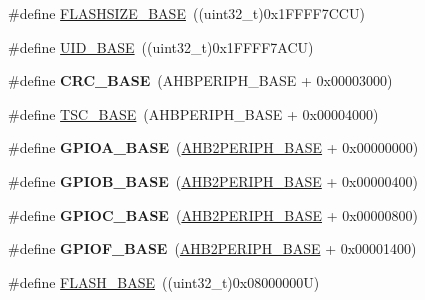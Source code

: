 \begin{DoxyCompactItemize}
\item 
\#define \hyperlink{group___peripheral__memory__map_ga776d985f2d4d40b588ef6ca9d573af78}{F\+L\+A\+S\+H\+S\+I\+Z\+E\+\_\+\+B\+A\+SE}~((uint32\+\_\+t)0x1\+F\+F\+F\+F7\+C\+C\+U)
\item 
\#define \hyperlink{group___peripheral__memory__map_ga664eda42b83c919b153b07b23348be67}{U\+I\+D\+\_\+\+B\+A\+SE}~((uint32\+\_\+t)0x1\+F\+F\+F\+F7\+A\+C\+U)
\item 
\mbox{\label{group___peripheral__memory__map_ga656a447589e785594cbf2f45c835ad7e}} 
\#define {\bfseries C\+R\+C\+\_\+\+B\+A\+SE}~(A\+H\+B\+P\+E\+R\+I\+P\+H\+\_\+\+B\+A\+SE + 0x00003000)
\item 
\#define \hyperlink{group___peripheral__memory__map_ga2bba7a31caeacaacd433abb71781e0af}{T\+S\+C\+\_\+\+B\+A\+SE}~(A\+H\+B\+P\+E\+R\+I\+P\+H\+\_\+\+B\+A\+SE + 0x00004000)
\item 
\mbox{\label{group___peripheral__memory__map_gad7723846cc5db8e43a44d78cf21f6efa}} 
\#define {\bfseries G\+P\+I\+O\+A\+\_\+\+B\+A\+SE}~(\hyperlink{group___peripheral__memory__map_gaeedaa71d22a1948492365e2cd26cfd46}{A\+H\+B2\+P\+E\+R\+I\+P\+H\+\_\+\+B\+A\+SE} + 0x00000000)
\item 
\mbox{\label{group___peripheral__memory__map_gac944a89eb789000ece920c0f89cb6a68}} 
\#define {\bfseries G\+P\+I\+O\+B\+\_\+\+B\+A\+SE}~(\hyperlink{group___peripheral__memory__map_gaeedaa71d22a1948492365e2cd26cfd46}{A\+H\+B2\+P\+E\+R\+I\+P\+H\+\_\+\+B\+A\+SE} + 0x00000400)
\item 
\mbox{\label{group___peripheral__memory__map_ga26f267dc35338eef219544c51f1e6b3f}} 
\#define {\bfseries G\+P\+I\+O\+C\+\_\+\+B\+A\+SE}~(\hyperlink{group___peripheral__memory__map_gaeedaa71d22a1948492365e2cd26cfd46}{A\+H\+B2\+P\+E\+R\+I\+P\+H\+\_\+\+B\+A\+SE} + 0x00000800)
\item 
\mbox{\label{group___peripheral__memory__map_ga7f9a3f4223a1a784af464a114978d26e}} 
\#define {\bfseries G\+P\+I\+O\+F\+\_\+\+B\+A\+SE}~(\hyperlink{group___peripheral__memory__map_gaeedaa71d22a1948492365e2cd26cfd46}{A\+H\+B2\+P\+E\+R\+I\+P\+H\+\_\+\+B\+A\+SE} + 0x00001400)
\item 
\#define \hyperlink{group___peripheral__memory__map_ga23a9099a5f8fc9c6e253c0eecb2be8db}{F\+L\+A\+S\+H\+\_\+\+B\+A\+SE}~((uint32\+\_\+t)0x08000000\+U)

\end{DoxyCompactItemize}
